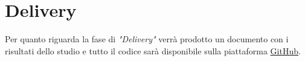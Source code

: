 \documentclass[ 11pt, oneside, italian, onehalfspacing, headsepline, ]{MastersDoctoralThesis}
\begin{document}
{\chapter{Delivery}}

Per quanto riguarda la fase di \textit{"Delivery"} verrà prodotto un documento con i risultati dello studio e tutto il codice sarà disponibile sulla piattaforma \href{https://github.com/dj-d/FoxWall}{GitHub}.


\printbibliography\
\end{document}
